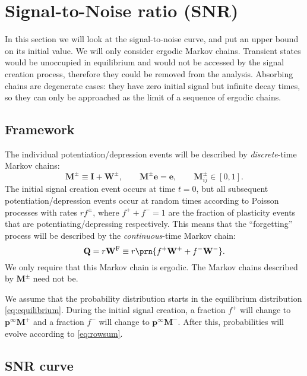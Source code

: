 \documentclass[12pt]{article}
\newcommand{\I}{\mathbf{I}}
\newcommand{\onev}{\mathbf{e}}
\newcommand{\MM}{\mathbf{Q}}
\newcommand{\eq}{\mathbf{p}^\infty}
\newcommand{\W}{\mathbf{W}}
\newcommand{\M}{\mathbf{M}}
\newcommand{\frg}{\W^{\mathrm{F}}}
\begin{document}
\section{Signal-to-Noise ratio (SNR)}\label{sec:SNR}

In this section we will look at the signal-to-noise curve, and put an upper bound on its initial value.
We will only consider ergodic Markov chains.
Transient states would be unoccupied in equilibrium and would not be accessed by the signal creation process, therefore they could be removed from the analysis.
Absorbing chains are degenerate cases: they have zero initial signal but infinite decay times, so they can only be approached as the limit of a sequence of ergodic chains.

\subsection{Framework}\label{sec:framework}

The individual potentiation/depression events will be described by \emph{discrete}-time Markov chains:
%
\begin{equation}\label{eq:MWdef}
  \M^\pm \equiv \I + \W^\pm,
  \qquad
  \M^\pm\onev = \onev,
  \qquad
  \M^\pm_{ij} \in [0,1].
\end{equation}
%
The initial signal creation event occurs at time $t=0$, but all subsequent potentiation/depression events occur at random times according to Poisson processes with rates $rf^\pm$, where $f^++f^-=1$ are the fraction of plasticity events that are potentiating/depressing respectively.
This means that the ``forgetting'' process will be described by the \emph{continuous}-time Markov chain:
%
\begin{equation}\label{eq:forgetting}
  \MM = r \frg \equiv r\prn{f^+\W^+ + f^-\W^-}.
\end{equation}
%
We only require that this Markov chain is ergodic. The Markov chains described by $\M^\pm$ need not be.


We assume that the probability distribution starts in the equilibrium distribution \eqref{eq:equilibrium}.
During the initial signal creation, a fraction $f^+$ will change to $\eq\M^+$ and a fraction $f^-$ will change to $\eq\M^-$.
After this, probabilities will evolve according to \eqref{eq:rowsum}.

\subsection{SNR curve}\label{sec:SNRcurve}
\end{document}
